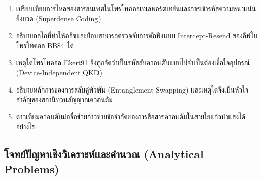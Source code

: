 \begin{enumerate}[label=\textbf{\arabic*.}]
    \item เปรียบเทียบการไหลของสารสนเทศในโพรโทคอลเทเลพอร์ตเทชันและการเข้ารหัสความหนาแน่นยิ่งยวด (Superdense Coding)
    \item อธิบายกลไกที่ทำให้อลิซและบ็อบสามารถตรวจจับการดักฟังแบบ Intercept-Resend ของอีฟในโพรโทคอล BB84 ได้
    \item เหตุใดโพรโทคอล Ekert91 จึงถูกจัดว่าเป็นรหัสลับควอนตัมแบบไม่จำเป็นต้องเชื่อใจอุปกรณ์ (Device-Independent QKD)
    \item อธิบายหลักการของการสลับคู่พัวพัน (Entanglement Swapping) และเหตุใดจึงเป็นหัวใจสำคัญของสถานีทวนสัญญาณควอนตัม
    \item ดาวเทียมควอนตัมม่อจื่อช่วยก้าวข้ามข้อจำกัดของการสื่อสารควอนตัมในสายใยแก้วนำแสงได้อย่างไร
\end{enumerate}

\subsection*{โจทย์ปัญหาเชิงวิเคราะห์และคำนวณ (Analytical Problems)}

